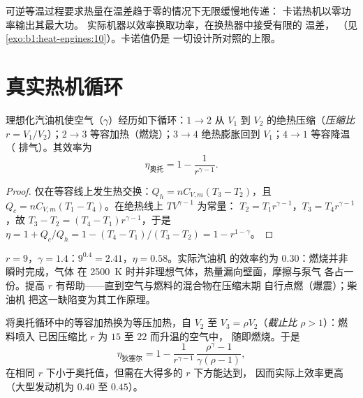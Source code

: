 \begin{remark}\label{rem:b1:heat-engines:notengine}
可逆等温过程要求热量在温差趋于零的情况下无限缓慢地传递：
卡诺热机以零功率输出其最大功。
实际机器以效率换取功率，在换热器中接受有限的
温差，
（见\cref{exo:b1:heat-engines:10}）。卡诺值仍是
一切设计所对照的上限。
\end{remark}

\section{真实热机循环}

\begin{proposition}[奥托循环]\label{prop:b1:heat-engines:otto}
理想化汽油机使空气（$\gamma$）经历如下循环：$1 \to 2$
从 $V_1$ 到 $V_2$ 的绝热压缩（\emph{压缩比}
$r = V_1/V_2$）；$2 \to 3$ 等容加热（燃烧）；$3 \to 4$
绝热膨胀回到 $V_1$；$4 \to 1$ 等容降温（
排气）。其效率为
\[
\eta_{\text{奥托}} = 1 - \frac{1}{r^{\gamma-1}} .
\]
\end{proposition}

\begin{proof}
仅在等容线上发生热交换：$Q_h = nC_{V,m}(T_3 - T_2)$，且
$Q_c = nC_{V,m}(T_1 - T_4)$。在绝热线上 $TV^{\gamma-1}$ 为常量：
$T_2 = T_1r^{\gamma-1}$，$T_3 = T_4r^{\gamma-1}$，故 $T_3 - T_2 =
(T_4 - T_1)r^{\gamma-1}$，于是
$\eta = 1 + Q_c/Q_h = 1 - (T_4 - T_1)/(T_3 - T_2) = 1 - r^{1-\gamma}$。
\end{proof}

\begin{example}[汽油机的数值]\label{ex:b1:heat-engines:ottonumbers}
$r = 9$，$\gamma = 1.4$：$9^{0.4} = 2.41$，$\eta = 0.58$。实际汽油机
的效率约为 $0.30$：燃烧并非瞬时完成，气体
在 \qty{2500}{K} 时并非理想气体，热量漏向壁面，摩擦与泵气
各占一份。提高 $r$ 有帮助——直到空气与燃料的混合物在压缩末期
自行点燃（爆震）；柴油机
把这一缺陷变为其工作原理。
\end{example}

\begin{proposition}[狄塞尔循环]\label{prop:b1:heat-engines:diesel}
将奥托循环中的等容加热换为等压加热，自
$V_2$ 至 $V_3 = \rho V_2$（\emph{截止比} $\rho > 1$）：燃料喷入
已因压缩比 $r$ 为 $15$ 至 $22$ 而升温的空气中，
随即燃烧。于是
\[
\eta_{\text{狄塞尔}} = 1 - \frac{1}{r^{\gamma-1}}\,\frac{\rho^{\gamma} - 1}{\gamma(\rho - 1)} ,
\]
在相同 $r$ 下小于奥托值，但需在大得多的 $r$ 下方能达到，
因而实际上效率更高（大型发动机为 $0.40$ 至 $0.45$）。
\end{proposition}

